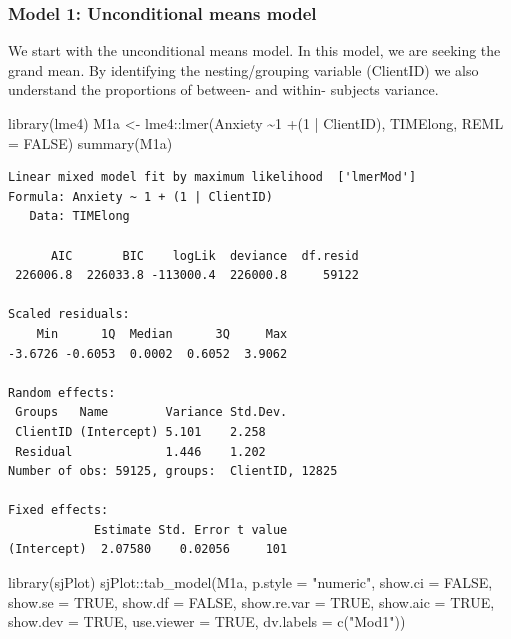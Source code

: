 \documentclass[
  english,
]{book}
\newenvironment{Shaded}{\begin{snugshade}}{\end{snugshade}}
\newcommand{\AttributeTok}[1]{\textcolor[rgb]{0.77,0.63,0.00}{#1}}
\newcommand{\ConstantTok}[1]{\textcolor[rgb]{0.00,0.00,0.00}{#1}}
\newcommand{\DecValTok}[1]{\textcolor[rgb]{0.00,0.00,0.81}{#1}}
\newcommand{\FunctionTok}[1]{\textcolor[rgb]{0.00,0.00,0.00}{#1}}
\newcommand{\NormalTok}[1]{#1}
\newcommand{\OtherTok}[1]{\textcolor[rgb]{0.56,0.35,0.01}{#1}}
\newcommand{\SpecialCharTok}[1]{\textcolor[rgb]{0.00,0.00,0.00}{#1}}
\newcommand{\StringTok}[1]{\textcolor[rgb]{0.31,0.60,0.02}{#1}}
\begin{document}
\hypertarget{model-1-unconditional-means-model}{%
\subsubsection{Model 1: Unconditional means model}\label{model-1-unconditional-means-model}}

We start with the unconditional means model. In this model, we are seeking the grand mean. By identifying the nesting/grouping variable (ClientID) we also understand the proportions of between- and within- subjects variance.

\begin{Shaded}
\begin{Highlighting}[]
\FunctionTok{library}\NormalTok{(lme4)}
\NormalTok{M1a }\OtherTok{\textless{}{-}}\NormalTok{ lme4}\SpecialCharTok{::}\FunctionTok{lmer}\NormalTok{(Anxiety }\SpecialCharTok{\textasciitilde{}}\DecValTok{1} \SpecialCharTok{+}\NormalTok{(}\DecValTok{1} \SpecialCharTok{|}\NormalTok{ ClientID), TIMElong, }\AttributeTok{REML =} \ConstantTok{FALSE}\NormalTok{)}
\FunctionTok{summary}\NormalTok{(M1a)}
\end{Highlighting}
\end{Shaded}

\begin{verbatim}
Linear mixed model fit by maximum likelihood  ['lmerMod']
Formula: Anxiety ~ 1 + (1 | ClientID)
   Data: TIMElong

      AIC       BIC    logLik  deviance  df.resid 
 226006.8  226033.8 -113000.4  226000.8     59122 

Scaled residuals: 
    Min      1Q  Median      3Q     Max 
-3.6726 -0.6053  0.0002  0.6052  3.9062 

Random effects:
 Groups   Name        Variance Std.Dev.
 ClientID (Intercept) 5.101    2.258   
 Residual             1.446    1.202   
Number of obs: 59125, groups:  ClientID, 12825

Fixed effects:
            Estimate Std. Error t value
(Intercept)  2.07580    0.02056     101
\end{verbatim}

\begin{Shaded}
\begin{Highlighting}[]
\FunctionTok{library}\NormalTok{(sjPlot)}
\NormalTok{sjPlot}\SpecialCharTok{::}\FunctionTok{tab\_model}\NormalTok{(M1a, }\AttributeTok{p.style =} \StringTok{"numeric"}\NormalTok{, }\AttributeTok{show.ci =} \ConstantTok{FALSE}\NormalTok{, }\AttributeTok{show.se =} \ConstantTok{TRUE}\NormalTok{, }\AttributeTok{show.df =} \ConstantTok{FALSE}\NormalTok{, }\AttributeTok{show.re.var =} \ConstantTok{TRUE}\NormalTok{, }\AttributeTok{show.aic =} \ConstantTok{TRUE}\NormalTok{, }\AttributeTok{show.dev =} \ConstantTok{TRUE}\NormalTok{, }\AttributeTok{use.viewer =} \ConstantTok{TRUE}\NormalTok{, }\AttributeTok{dv.labels =} \FunctionTok{c}\NormalTok{(}\StringTok{"Mod1"}\NormalTok{))}
\end{Highlighting}
\end{Shaded}
\end{document}
